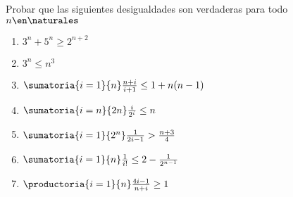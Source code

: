 \begin{enunciado}{\ejercicio}
  Probar que las siguientes desigualdades son verdaderas para todo $n \en \naturales$
  \begin{multicols}{2}
    \begin{enumerate}[label=\roman*)]
      \item $3^n + 5^n \geq 2^{n+2}$
      \item $3^n \leq n^3$
      \item $ \sumatoria{i=1}{n} \frac{n+i}{i+1} \leq 1 + n(n-1)$
      \item $ \sumatoria{i=n}{2n} \frac{i}{2^i} \leq n$
      \item $ \sumatoria{i=1}{2^n} \frac{1}{2i-1} > \frac{n+3}{4}$
      \item $ \sumatoria{i=1}{n} \frac{1}{i!} \leq 2 - \frac{1}{2^{n-1}}$
      \item $ \productoria{i=1}{n} \frac{4i-1}{n+i} \geq 1$
    \end{enumerate}
  \end{multicols}
\end{enunciado}

